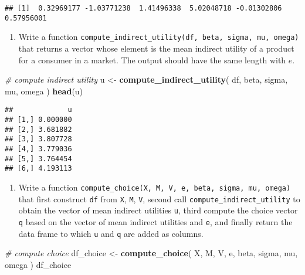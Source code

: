 \documentclass[
]{book}
\newenvironment{Shaded}{\begin{snugshade}}{\end{snugshade}}
\newcommand{\CommentTok}[1]{\textcolor[rgb]{0.56,0.35,0.01}{\textit{#1}}}
\newcommand{\FunctionTok}[1]{\textcolor[rgb]{0.13,0.29,0.53}{\textbf{#1}}}
\newcommand{\NormalTok}[1]{#1}
\newcommand{\OtherTok}[1]{\textcolor[rgb]{0.56,0.35,0.01}{#1}}
\providecommand{\tightlist}{%
  \setlength{\itemsep}{0pt}\setlength{\parskip}{0pt}}
\begin{document}
\begin{verbatim}
## [1]  0.32969177 -1.03771238  1.41496338  5.02048718 -0.01302806  0.57956001
\end{verbatim}

\begin{enumerate}
\def\labelenumi{\arabic{enumi}.}
\setcounter{enumi}{6}
\tightlist
\item
  Write a function \texttt{compute\_indirect\_utility(df,\ beta,\ sigma,\ mu,\ omega)} that returns a vector whose element is the mean indirect utility of a product for a consumer in a market. The output should have the same length with \(e\).
\end{enumerate}

\begin{Shaded}
\begin{Highlighting}[]
\CommentTok{\# compute indirect utility}
\NormalTok{u }\OtherTok{\textless{}{-}} 
  \FunctionTok{compute\_indirect\_utility}\NormalTok{(}
\NormalTok{    df, }
\NormalTok{    beta, }
\NormalTok{    sigma, }
\NormalTok{    mu, }
\NormalTok{    omega}
\NormalTok{    )}
\FunctionTok{head}\NormalTok{(u)}
\end{Highlighting}
\end{Shaded}

\begin{verbatim}
##             u
## [1,] 0.000000
## [2,] 3.681882
## [3,] 3.807728
## [4,] 3.779036
## [5,] 3.764454
## [6,] 4.193113
\end{verbatim}

\begin{enumerate}
\def\labelenumi{\arabic{enumi}.}
\setcounter{enumi}{7}
\tightlist
\item
  Write a function \texttt{compute\_choice(X,\ M,\ V,\ e,\ beta,\ sigma,\ mu,\ omega)} that first construct \texttt{df} from \texttt{X}, \texttt{M}, \texttt{V}, second call \texttt{compute\_indirect\_utility} to obtain the vector of mean indirect utilities \texttt{u}, third compute the choice vector \texttt{q} based on the vector of mean indirect utilities and \texttt{e}, and finally return the data frame to which \texttt{u} and \texttt{q} are added as columns.
\end{enumerate}

\begin{Shaded}
\begin{Highlighting}[]
\CommentTok{\# compute choice}
\NormalTok{df\_choice }\OtherTok{\textless{}{-}} 
  \FunctionTok{compute\_choice}\NormalTok{(}
\NormalTok{    X, }
\NormalTok{    M, }
\NormalTok{    V, }
\NormalTok{    e, }
\NormalTok{    beta, }
\NormalTok{    sigma, }
\NormalTok{    mu, }
\NormalTok{    omega}
\NormalTok{    )}
\NormalTok{df\_choice}
\end{Highlighting}
\end{Shaded}
\end{document}
